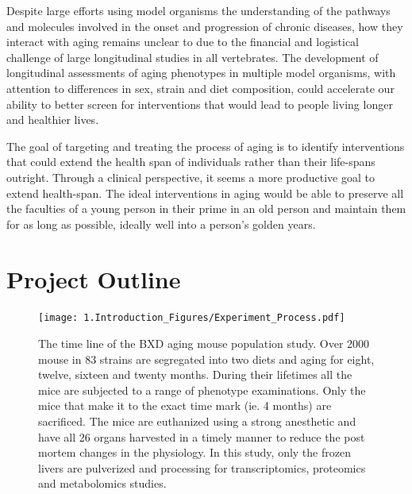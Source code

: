 \documentclass[a4paper]{book}
\begin{document}
Despite large efforts using model organisms the understanding of the pathways and molecules involved in the onset and progression of chronic diseases, how they interact with aging remains unclear to due to the financial and logistical challenge of large longitudinal studies in all vertebrates\citep{Williams2015TheAnalysis}. The development of longitudinal assessments of aging phenotypes in multiple model organisms, with attention to differences in sex, strain and diet composition, could accelerate our ability to better screen for interventions that would lead to people living longer and healthier lives.

The goal of targeting and treating the process of aging is to identify interventions that could extend the health span of individuals rather than their life-spans outright. Through a clinical perspective, it seems a more productive goal to extend health-span. The ideal interventions in aging would be able to preserve all the faculties of a young person in their prime in an old person and maintain them for as long as possible, ideally well into a person's golden years.
	
	\section{Project Outline}
	
	\begin{figure}[htb!]
		\centering
		\texttt{[image: 1.Introduction\_Figures/Experiment\_Process.pdf]}
		\caption{The time line of the BXD aging mouse population study. Over 2000 mouse in 83 strains are segregated into two diets and aging for eight, twelve, sixteen and twenty months. During their lifetimes all the mice are subjected to a range of phenotype examinations. Only the mice that make it to the exact time mark (ie. 4 months) are sacrificed. The  mice are euthanized using a strong anesthetic and have all 26 organs harvested in a timely manner to reduce the post mortem changes in the physiology. In this study, only the frozen livers are pulverized and processing for transcriptomics, proteomics and metabolomics studies.}
		\label{fig: Outline of the BXD Aging Population Study}
	\end{figure}
	
\end{document}
